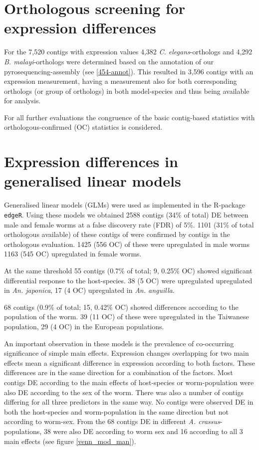 \section{Orthologous screening for expression differences}

For the 7,520 contigs with expression values 4,382
\textit{C. elegans}-orthologs and 4,292 \textit{B. malayi}-orthologs
were determined based on the annotation of our pyrosequencing-assembly
(see \ref{454-annot}). This resulted in 3,596 contigs with an
expression measurement, having a measurement also for both
corresponding orthologs (or group of orthologs) in both model-species
and thus being available for analysis.

For all further evaluations the congruence of the basic contig-based
statistics with orthologous-confirmed (OC) statistics is considered.

\section{Expression differences in generalised linear models}

Generalised linear models (GLMs) were used as implemented in the
R-package \texttt{edgeR}. Using these models we obtained 2588 contigs
(34\% of total) DE between male and female worms at a false discovery
rate (FDR) of 5\%. 1101 (31\% of total orthologous available) of these
contigs of were confirmed by contigs in the orthologous
evaluation. 1425 (556 OC) of these were upregulated in male worms 1163
(545 OC) upregulated in female worms.

At the same threshold 55 contigs (0.7\% of total; 9, 0.25\% OC) showed
significant differential response to the host-species. 38 (5 OC) were
upregulated upregulated in \textit{An. japonica}, 17 (4 OC)
upregulated in \textit{An. anguilla}.

68 contigs (0.9\% of total; 15, 0.42\% OC) showed differences
according to the population of the worm. 39 (11 OC) of these were
upregulated in the Taiwanese population, 29 (4 OC) in the European
populations.

An important observation in these models is the prevalence of
co-occurring significance of simple main effects. Expression changes
overlapping for two main effects mean a significant difference in
expression according to both factors. These differences are in the
same direction for a combination of the factors. Most contigs DE
according to the main effects of host-species or worm-population were
also DE according to the sex of the worm. There was also a number of
contigs differing for all three predictors in the same way. No contigs
were observed DE in both the host-species and worm-population in the
same direction but not according to worm-sex. From the 68 contigs DE
in different \textit{A. crassus}-populations, 38 were also DE
according to worm sex and 16 according to all 3 main effects (see
figure \ref{venn_mod_man}).

